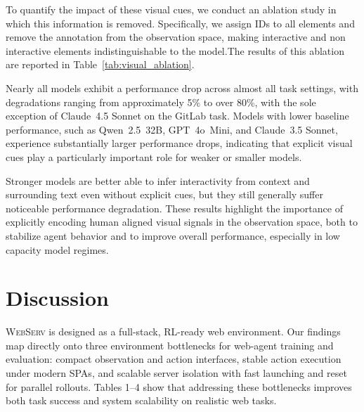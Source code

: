 \documentclass{article}
\DeclareRobustCommand{\projectname}{\textsc{WebServ}\xspace}
\begin{document}
To quantify the impact of these visual cues, we conduct an ablation study in which this information is removed. Specifically, we assign IDs to all elements and remove the  annotation from the observation space, making interactive and non interactive elements indistinguishable to the model.The results of this ablation are reported in Table~\ref{tab:visual_ablation}. 

Nearly all models exhibit a performance drop across almost all task settings, with degradations ranging from approximately 5\% to over 80\%, with the sole exception of Claude~4.5 Sonnet on the GitLab task. Models with lower baseline performance, such as Qwen~2.5~32B, GPT~4o~Mini, and Claude~3.5 Sonnet, experience substantially larger performance drops, indicating that explicit visual cues play a particularly important role for weaker or smaller models. 

Stronger models are better able to infer interactivity from context and surrounding text even without explicit cues, but they still generally suffer noticeable performance degradation. These results highlight the importance of explicitly encoding human aligned visual signals in the observation space, both to stabilize agent behavior and to improve overall performance, especially in low capacity model regimes.


\section{Discussion}

\projectname is designed as a full-stack, RL-ready web environment. Our findings map directly onto three environment bottlenecks for web-agent training and evaluation: compact observation and action interfaces, stable action execution under modern SPAs, and scalable server isolation with fast launching and reset for parallel rollouts. Tables 1–4 show that addressing these bottlenecks improves both task success and system scalability on realistic web tasks.
\end{document}
